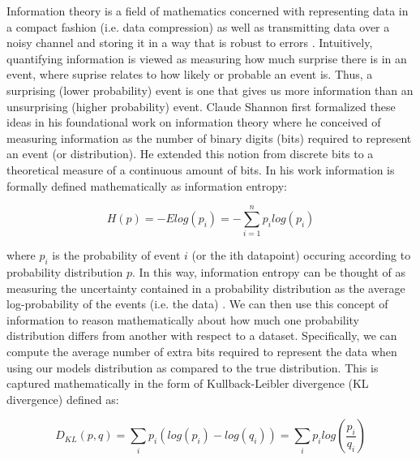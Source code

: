 Information theory is a field of mathematics concerned with representing data in a compact fashion (i.e. data compression) as well as transmitting data over a noisy channel and storing it in a way that is robust to errors \cite{Murphy2012}. Intuitively, quantifying information is viewed as measuring how much surprise there is in an event, where suprise relates to how likely or probable an event is. Thus, a surprising (lower probability) event is one that gives us more information than an unsurprising (higher probability) event. Claude Shannon first formalized these ideas in his foundational work on information theory \cite{Shannon1948} where he conceived of measuring information as the number of binary digits (bits) required to represent an event (or distribution). He extended this notion from discrete bits to a theoretical measure of a continuous amount of bits. In his work information is formally defined mathematically as information entropy:

\begin{equation}
H(p) = -Elog(p_i) = - \sum_{i=1}^{n} p_i log(p_i)
\end{equation}

where $p_i$ is the probability of event $i$ (or the ith datapoint) occuring according to probability distribution $p$. In this way, information entropy can be thought of as measuring the uncertainty contained in a probability distribution as the average log-probability of the events (i.e. the data) \cite{McElreath2020}. We can then use this concept of information to reason mathematically about how much one probability distribution differs from another with respect to a dataset. Specifically, we can compute the average number of extra bits required to represent the data when using our models distribution as compared to the true distribution. This is captured mathematically in the form of Kullback-Leibler divergence (KL divergence) defined as:

\begin{equation}
D_{KL}(p,q) = \sum_{i} p_i (log(p_i) - log(q_i)) = \sum_{i} p_i log \left(\frac{p_i}{q_i} \right)
\end{equation}

